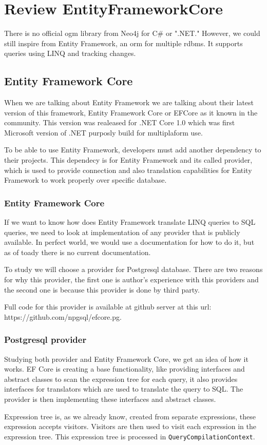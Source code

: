 \chapter{Review EntityFrameworkCore}

There is no official \acrshort{ogm} library from Neo4j for C\# or ".NET."
However, we could still inspire from Entity Framework,
an \acrshort{orm} for multiple \acrshort{rdbms}. It supports queries using LINQ and tracking changes. \cite{wadepickett_entity_nodate}

\section {Entity Framework Core}

When we are talking about Entity Framework we are talking about their latest version of this framework, Entity Framework Core or EFCore as it known in the community.
This version was realeased for .NET Core 1.0 which was first Microsoft version of .NET purposly build for multiplaform use.

To be able to use Entity Framework, developers must add another dependency to their projects. This dependecy is for Entity Framework and its called provider, which is used
to provide connection and also translation capabilities for Entity Framework to work properly over specific database.

\subsection {Entity Framework Core}

If we want to know how does Entity Framework translate LINQ queries to SQL queries, we need to look at implementation of any provider that is publicly available.
In perfect world, we would use a documentation for how to do it, but as of toady there is no current documentation.

To study we will choose a provider for Postgresql database. There are two reasons for why this provider, the first one is author's experience with this providers and the second one
is because this provider is done by third party.

Full code for this provider is available at github server at this url: https://github.com/npgsql/efcore.pg.

\subsection {Postgresql provider}

Studying both provider and Entity Framework Core, we get an idea of how it works. EF Core is creating a base functionality, like providing interfaces and abstract classes to scan
the expression tree for each query, it also provides interfaces for translators which are used to translate the query to SQL. The provider is then implementing these interfaces and abstract classes.

Expression tree is, as we already know, created from separate expressions, these expression accepts visitors. Visitors are then used to visit each expression in the expression tree.
This expression tree is processed in \texttt{QueryCompilationContext}.